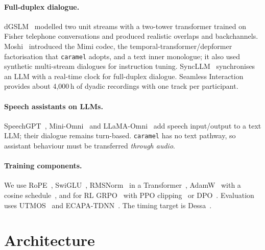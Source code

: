 \documentclass[10pt]{article}
\newcommand{\caramel}{\texttt{caramel}}
\begin{document}
\paragraph{Full-duplex dialogue.} dGSLM~\cite{nguyen2023dgslm} modelled two unit streams with a two-tower transformer trained on Fisher telephone conversations and produced realistic overlaps and backchannels. Moshi~\cite{defossez2024moshi} introduced the Mimi codec, the temporal-transformer/depformer factorisation that \caramel{} adopts, and a text inner monologue; it also used synthetic multi-stream dialogues for instruction tuning. SyncLLM~\cite{veluri2024syncllm} synchronises an LLM with a real-time clock for full-duplex dialogue. Seamless Interaction~\cite{agrawal2025seamless} provides about 4{,}000\,h of dyadic recordings with one track per participant.
\paragraph{Speech assistants on LLMs.} SpeechGPT~\cite{zhang2023speechgpt}, Mini-Omni~\cite{xie2024miniomni} and LLaMA-Omni~\cite{fang2024llamaomni} add speech input/output to a text LLM; their dialogue remains turn-based. \caramel{} has no text pathway, so assistant behaviour must be transferred \emph{through audio}.
\paragraph{Training components.} We use RoPE~\cite{su2021roformer}, SwiGLU~\cite{shazeer2020glu}, RMSNorm~\cite{zhang2019rmsnorm} in a Transformer~\cite{vaswani2017attention}, AdamW~\cite{loshchilov2019adamw} with a cosine schedule~\cite{loshchilov2017sgdr}, and for RL GRPO~\cite{shao2024deepseekmath} with PPO clipping~\cite{schulman2017ppo} or DPO~\cite{rafailov2023dpo}. Evaluation uses UTMOS~\cite{saeki2022utmos} and ECAPA-TDNN~\cite{desplanques2020ecapa}. The timing target is Dessa~\cite{dessa}.

\section{Architecture}
\label{sec:arch}
\end{document}
